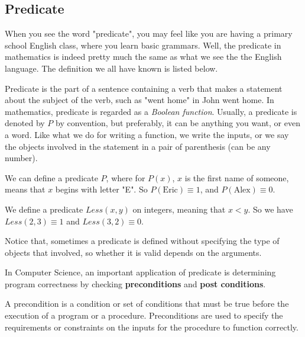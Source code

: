 \subsection{Predicate}
When you see the word "predicate", you may feel like you are having a primary school English class, where you learn basic grammars. Well, the predicate in mathematics is indeed pretty much the same as what we see the the English language. The definition we all have known is listed below.
\begin{definition}[Predicate]
    Predicate is the part of a sentence containing a verb that makes a statement about the subject of the verb, such as "went home" in John went home. In mathematics, predicate is regarded as a \textit{Boolean function}. Usually, a predicate is denoted by $P$ by convention, but preferably, it can be anything you want, or even a word. Like what we do for writing a function, we write the inputs, or we say the objects involved in the statement in a pair of parenthesis (can be any number). 
\end{definition}

\begin{example}
    We can define a predicate $P$, where for $P(x)$, $x$ is the first name of someone, means that $x$ begins with letter "E". So $P(\text{Eric})\equiv 1$, and $P(\text{Alex})\equiv 0$.
\end{example}

\begin{example}
    We define a predicate $Less(x, y)$ on integers, meaning that $x < y$. So we have $Less(2, 3) \equiv 1$ and $Less(3, 2) \equiv 0$. 
\end{example}

\begin{remark}
    Notice that, sometimes a predicate is defined without specifying the type of objects that involved, so whether it is valid depends on the arguments. 
\end{remark}

In Computer Science, an important application of predicate is determining program correctness by checking \textbf{preconditions} and \textbf{post conditions}.

\begin{definition}[Precondition]
     A precondition is a condition or set of conditions that must be true before the execution of a program or a procedure. Preconditions are used to specify the requirements or constraints on the inputs for the procedure to function correctly.
\end{definition}

